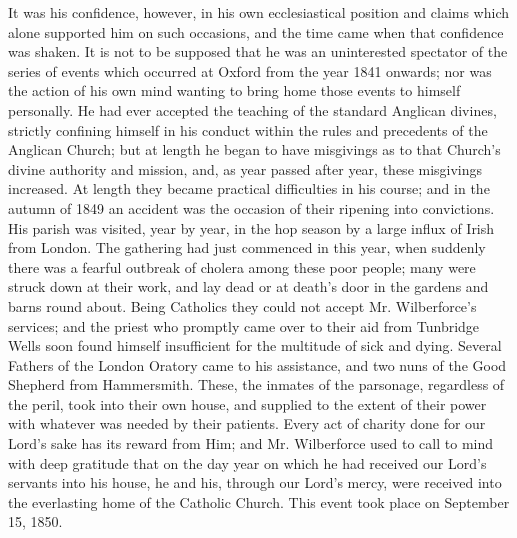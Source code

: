 It was his confidence, however, in his own
ecclesiastical position and claims which alone supported him on such
occasions, and the time came when that confidence was shaken. It is
not to be supposed that he was an uninterested spectator of the series
of events which occurred at Oxford from the year 1841 onwards; nor was
the action of his own mind wanting to bring home those events to
himself personally. He had ever accepted the teaching of the standard
Anglican divines, strictly confining himself in his conduct within the
rules and precedents of the Anglican Church; but at length he began to
have misgivings as to that Church's divine authority and mission,
and, as year passed after year, these misgivings increased. At length
they became practical difficulties in his course; and in the autumn of
1849 an accident was the occasion of their ripening into convictions.
His parish was visited, year by year, in the hop season by a large
influx of Irish from London. The gathering had just commenced in this
year, when suddenly there was a fearful outbreak of cholera among
these poor people; many were struck down at their work, and lay
dead or at death's door in the gardens and barns round about. Being
Catholics they could not accept Mr. Wilberforce's services; and the
priest who promptly came over to their aid from Tunbridge Wells soon
found himself insufficient for the multitude of sick and dying.
Several Fathers of the London Oratory came to his assistance, and two
nuns of the Good Shepherd from Hammersmith. These, the inmates of the
parsonage, regardless of the peril, took into their own house, and
supplied to the extent of their power with whatever was needed by
their patients. Every act of charity done for our Lord's sake has
its reward from Him; and Mr. Wilberforce used to call to mind with
deep gratitude that on the day year on which he had received our
Lord's servants into his house, he and his, through our Lord's
mercy, were received into the everlasting home of the Catholic Church.
This event took place on September 15, 1850.

